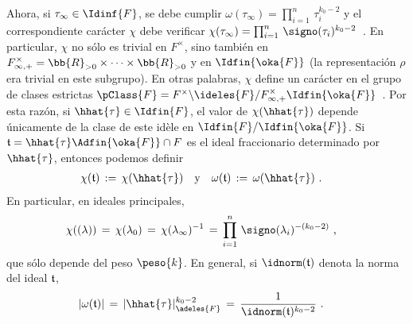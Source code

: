Ahora, si $\tau_{\infty}\in\Idinf{F}$, se debe cumplir
\begin{math}
	\omega(\tau_{\infty})=\prod_{i=1}^{n}\,\tau_{i}^{k_{0}-2}
\end{math} y el correspondiente car\'{a}cter $\chi$ debe verificar
\begin{math}
	\chi(\tau_{\infty})=\prod_{i=1}^{n}\,
		\signo(\tau_{i})^{k_{0}-2}
\end{math}~.
En particular, $\chi$ no s\'{o}lo es trivial en $F^{\times}$, sino tambi\'{e}n
en
\begin{math}
	F_{\infty,+}^{\times}=\bb{R}_{>0}\times\cdots\times\bb{R}_{>0}
\end{math} y en $\Idfin{\oka{F}}$ (la representaci\'{o}n $\rho$ era trivial en
este subgrupo). En otras palabras, $\chi$ define un car\'{a}cter en el grupo de
clases estrictas
\begin{math}
	\pClass{F}=F^{\times}\backslash\ideles{F}/
		F^{\times}_{\infty,+}\Idfin{\oka{F}}
\end{math}~.
Por esta raz\'{o}n, si $\hhat{\tau}\in\Idfin{F}$, el valor de
$\chi(\hhat{\tau})$ depende \'{u}nicamente de la clase de este id\`{e}le en
$\Idfin{F}/\Idfin{\oka{F}}$. Si $\frak{t}=\hhat{\tau}\Adfin{\oka{F}}\cap F$ es
el ideal fraccionario determinado por $\hhat{\tau}$, entonces podemos definir
\begin{align*}
	\chi(\frak{t}) \,:=\,\chi(\hhat{\tau})
		& \quad\text{y}\quad\omega(\frak{t})\,:=\,\omega(\hhat{\tau})
	\text{ .}
\end{align*}
%
En particular, en ideales principales,
\begin{align*}
	\chi((\lambda)) & \,=\,\chi(\lambda_{0})\,=\,
		\chi(\lambda_{\infty})^{-1}\,=\,
		\prod_{i=1}^{n}\,\signo(\lambda_{i})^{-(k_{0}-2)}
	\text{ ,}
\end{align*}
%
que s\'{o}lo depende del peso $\peso{k}$. En general, si $\idnorm(\frak{t})$
denota la norma del ideal $\frak{t}$,
\begin{align*}
	|\omega(\frak{t})| & \,=\,|\hhat{\tau}|_{\adeles{F}}^{k_{0}-2}
		\,=\,\frac{1}{\idnorm(\frak{t})^{k_{0}-2}}
	\text{ .}
\end{align*}
%
